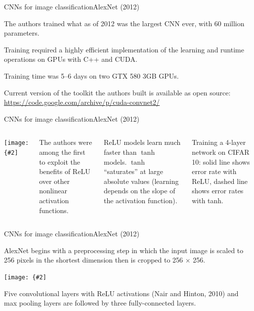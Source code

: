 \documentclass{beamer}
\newcommand{\myfig}[3]{\centerline{\texttt{[image: \{\#2]}}}
\begin{document}
\begin{frame}{CNNs for image classification}{AlexNet (2012)}

  The authors trained what as of 2012 was the largest CNN ever, with
  60 million parameters.

  \medskip

  Training required a highly efficient implementation of the learning
  and runtime operations on GPUs with C++ and CUDA.

  \medskip

  Training time was 5--6 days on two GTX 580 3GB GPUs.
  
  \medskip

  Current version of the toolkit the authors built is available as
  open source: \url{https://code.google.com/archive/p/cuda-convnet2/}
  
\end{frame}


\begin{frame}{CNNs for image classification}{AlexNet (2012)}

  \begin{columns}

    \column{2.2in}
    
    \myfig{2in}{krizhevsky-fig1}{Krizhevsky et al.\ (2012), Fig.\ 1}

    \column{2.3in}
    
    The authors were among the first to exploit the benefits of ReLU
    over other nonlinear activation functions.

    \medskip

    ReLU models learn much faster than $\tanh$ models. $\tanh$
    ``saturates'' at large absolute values (learning depends on the
    slope of the activation function).

    \medskip
  
    Training a 4-layer network on CIFAR 10: solid line shows error
    rate with ReLU, dashed line shows error rates with tanh.

  \end{columns}
  
\end{frame}


\begin{frame}{CNNs for image classification}{AlexNet (2012)}

  AlexNet begins with a preprocessing step in which the input image is
  scaled to 256 pixels in the shortest dimension then is cropped to
  256 $\times$ 256.

  \medskip

  \myfig{4.5in}{alexnet-fig2}{Krizhevsky, Sutskever, and Hinton,
    (2012), Fig.\ 2}

  \medskip

  Five convolutional layers with ReLU activations (Nair and Hinton,
  2010) and max pooling layers are followed by three fully-connected
  layers.

\end{frame}
\end{document}
